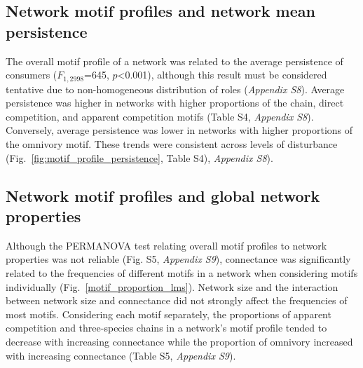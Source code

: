 \documentclass[12pt]{article}
\begin{document}
\begin{spacing}{2.0}
    \subsection*{Network motif profiles and network mean persistence}
        The overall motif profile of a network was related to the average persistence of consumers ($F_{1,2998}$=645, $p$\textless0.001), although this result must be considered tentative due to non-homogeneous distribution of roles (\emph{Appendix S8}). 
        Average persistence was higher in networks with higher proportions of the chain, direct competition, and apparent competition motifs (Table S4, \emph{Appendix S8}). 
        Conversely, average persistence was lower in networks with higher proportions of the omnivory motif. 
        These trends were consistent across levels of disturbance (Fig.~\ref{fig:motif_profile_persistence}, Table S4), \emph{Appendix S8}).%


    \subsection*{Network motif profiles and global network properties}

        Although the PERMANOVA test relating overall motif profiles to network properties was not reliable (Fig. S5, \emph{Appendix S9}), 
        connectance was significantly related to the frequencies of different motifs in a network when considering motifs individually (Fig.~\ref{motif_proportion_lms}).
        Network size and the interaction between network size and connectance did not strongly affect the frequencies of most motifs.
        Considering each motif separately, the proportions of apparent competition and three-species chains in a network's motif profile tended to decrease with increasing connectance while the proportion of omnivory increased with increasing connectance (Table S5, \emph{Appendix S9}). 
    










\end{spacing}
\end{document}

